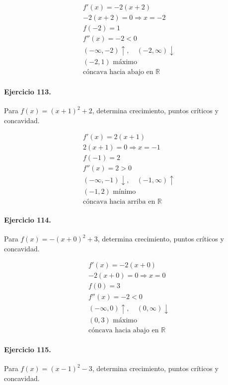 \documentclass[11pt,a4paper]{article}
\begin{document}
\[
\begin{aligned}
f'(x)=-2(x+2)\\
-2(x+2)=0\Rightarrow x=-2\\
f(-2)=1\\
f''(x)=-2<0\\
(-\infty,-2)\uparrow,\quad(-2,\infty)\downarrow\\
(-2,1)\text{ máximo}\\
\text{{cóncava hacia abajo en }}\mathbb{R}
\end{aligned}
\]


\paragraph{Ejercicio 113.} Para $f(x)=(x+1)^2+2$, determina crecimiento, puntos críticos y concavidad.

\[
\begin{aligned}
f'(x)=2(x+1)\\
2(x+1)=0\Rightarrow x=-1\\
f(-1)=2\\
f''(x)=2>0\\
(-\infty,-1)\downarrow,\quad(-1,\infty)\uparrow\\
(-1,2)\text{ mínimo}\\
\text{{cóncava hacia arriba en }}\mathbb{R}
\end{aligned}
\]


\paragraph{Ejercicio 114.} Para $f(x)=-(x+0)^2+3$, determina crecimiento, puntos críticos y concavidad.

\[
\begin{aligned}
f'(x)=-2(x+0)\\
-2(x+0)=0\Rightarrow x=0\\
f(0)=3\\
f''(x)=-2<0\\
(-\infty,0)\uparrow,\quad(0,\infty)\downarrow\\
(0,3)\text{ máximo}\\
\text{{cóncava hacia abajo en }}\mathbb{R}
\end{aligned}
\]


\paragraph{Ejercicio 115.} Para $f(x)=(x-1)^2-3$, determina crecimiento, puntos críticos y concavidad.
\end{document}
